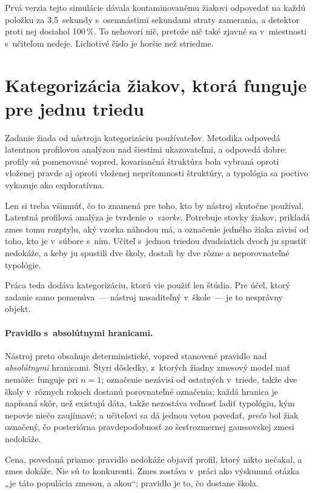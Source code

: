 Prvá verzia tejto simulácie dávala kontaminovanému žiakovi odpovedať na každú
položku za 3{,}5~sekundy s~osemnástimi sekundami straty zamerania, a detektor
proti nej dosiahol 100\,\%. To nehovorí nič, pretože nič také zjavné sa
v~miestnosti s~učiteľom nedeje. Lichotivé číslo je horšie než striedme.

\section{Kategorizácia žiakov, ktorá funguje pre jednu triedu}
\label{sec:pravidlovy-profil}

Zadanie žiada od nástroja kategorizáciu používateľov. Metodika odpovedá latentnou
profilovou analýzou nad šiestimi ukazovateľmi, a odpovedá dobre: profily sú
pomenované vopred, kovariančná štruktúra bola vybraná oproti vloženej pravde aj
oproti vloženej neprítomnosti štruktúry, a typológia sa poctivo vykazuje ako
exploratívna.

Len si treba všimnúť, čo to znamená pre toho, kto by nástroj skutočne používal.
Latentná profilová analýza je tvrdenie o~\emph{vzorke}. Potrebuje stovky žiakov,
prikladá zmes tomu rozptylu, aký vzorka náhodou má, a označenie jedného žiaka
závisí od toho, kto je v~súbore s~ním. Učiteľ s~jednou triedou dvadsiatich dvoch
ju spustiť nedokáže, a keby ju spustili dve školy, dostali by dve rôzne a
neporovnateľné typológie.

Práca teda dodáva kategorizáciu, ktorú vie použiť len štúdia. Pre účel, ktorý
zadanie samo pomenúva~--- nástroj nasaditeľný v~škole~--- je to nesprávny objekt.

\paragraph{Pravidlo s~absolútnymi hranicami.} Nástroj preto obsahuje
deterministické, vopred stanovené pravidlo nad \emph{absolútnymi} hranicami. Štyri
dôsledky, z~ktorých žiadny zmesový model mať nemôže: funguje pri $n=1$; označenie
nezávisí od ostatných v~triede, takže dve školy v~rôznych rokoch dostanú
porovnateľné označenia; každá hranica je napísaná skôr, než existujú dáta, takže
nezostáva voľnosť ladiť typológiu, kým nepovie niečo zaujímavé; a učiteľovi sa dá
jednou vetou povedať, \emph{prečo} bol žiak označený, čo posteriórna
pravdepodobnosť zo šesťrozmernej gaussovskej zmesi nedokáže.

Cena, povedaná priamo: pravidlo nedokáže objaviť profil, ktorý nikto nečakal, a
zmes dokáže. Nie sú to konkurenti. Zmes zostáva v~práci ako výskumná otázka „je
táto populácia zmesou, a akou“; pravidlo je to, čo dostane škola.

